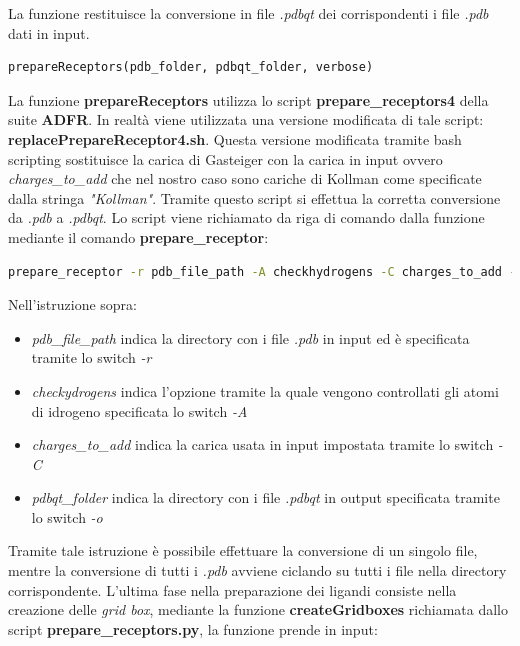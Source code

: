 La funzione restituisce la conversione in file \textit{.pdbqt} dei corrispondenti i file \textit{.pdb} dati in input.

\begin{lstlisting}[language=Python, label=lst:code26, caption={prepareReceptors}]
prepareReceptors(pdb_folder, pdbqt_folder, verbose)
\end{lstlisting}

La funzione \textbf{prepareReceptors} utilizza lo script \textbf{prepare\_receptors4} della suite \textbf{ADFR}. In realtà viene utilizzata una versione modificata di tale script: \textbf{replacePrepareReceptor4.sh}. Questa versione modificata tramite bash scripting sostituisce la carica di Gasteiger con la carica in input ovvero \textit{charges\_to\_add} che nel nostro caso sono cariche di Kollman come specificate dalla stringa \textit{"Kollman"}. Tramite questo script si effettua la corretta conversione da \textit{.pdb} a \textit{.pdbqt}. Lo script viene richiamato da riga di comando dalla funzione mediante il comando \textbf{prepare\_receptor}:

\begin{lstlisting}[language=bash, label=lst:code27, caption={comando per convertire file da .pdb a .pdbqt}]
prepare_receptor -r pdb_file_path -A checkhydrogens -C charges_to_add -e -o pdbqt_folder
\end{lstlisting}

Nell'istruzione sopra:

\begin{itemize}
    \item \textit{pdb\_file\_path} indica la directory con i file \textit{.pdb} in input ed è specificata tramite lo switch \textit{-r}
    \item \textit{checkydrogens} indica l'opzione tramite la quale vengono controllati gli atomi di idrogeno specificata lo switch \textit{-A}    
    \item \textit{charges\_to\_add} indica la carica usata in input impostata tramite lo switch \textit{-C} 
    \item \textit{pdbqt\_folder} indica la directory con i file \textit{.pdbqt} in output specificata tramite lo switch \textit{-o}
\end{itemize}

Tramite tale istruzione è possibile effettuare la conversione di un singolo file, mentre la conversione di tutti i \textit{.pdb} avviene ciclando su tutti i file nella directory corrispondente.\newline
L'ultima fase nella preparazione dei ligandi consiste nella creazione delle \textit{grid box}, mediante la funzione \textbf{createGridboxes} richiamata dallo script \textbf{prepare\_receptors.py}, la funzione prende in input:

